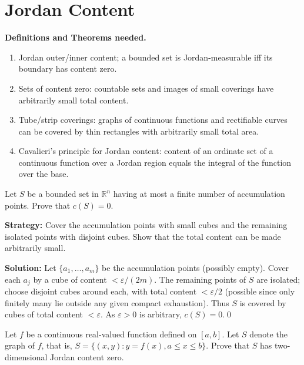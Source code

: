 \section{Jordan Content}
\noindent\textbf{Definitions and Theorems needed.}
\begin{enumerate}[label=(\roman*)]
    \item Jordan outer/inner content; a bounded set is Jordan-measurable iff its boundary has content zero.
    \item Sets of content zero: countable sets and images of small coverings have arbitrarily small total content.
    \item Tube/strip coverings: graphs of continuous functions and rectifiable curves can be covered by thin rectangles with arbitrarily small total area.
    \item Cavalieri's principle for Jordan content: content of an ordinate set of a continuous function over a Jordan region equals the integral of the function over the base.
\end{enumerate}



\begin{problembox}
Let \( S \) be a bounded set in \( \mathbb{R}^n \) having at most a finite number of accumulation points. Prove that \( c(S) = 0 \).
\end{problembox}

\noindent\textbf{Strategy:} Cover the accumulation points with small cubes and the remaining isolated points with disjoint cubes. Show that the total content can be made arbitrarily small.

\bigskip\noindent\textbf{Solution:}
Let $\{a_1,\dots,a_m\}$ be the accumulation points (possibly empty). Cover each $a_j$ by a cube of content $<\varepsilon/(2m)$. The remaining points of $S$ are isolated; choose disjoint cubes around each, with total content $<\varepsilon/2$ (possible since only finitely many lie outside any given compact exhaustion). Thus $S$ is covered by cubes of total content $<\varepsilon$. As $\varepsilon>0$ is arbitrary, $c(S)=0$.\qed


\begin{problembox}
Let \( f \) be a continuous real-valued function defined on \([a, b]\). Let \( S \) denote the graph of \( f \), that is, \( S = \{(x, y) : y = f(x), a \leq x \leq b\} \). Prove that \( S \) has two-dimensional Jordan content zero.
\end{problembox}

